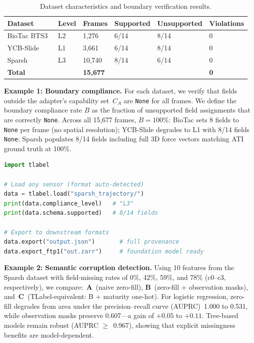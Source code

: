 \documentclass[preprint,12pt,a4paper]{elsarticle}
\begin{document}
\begin{table}[ht]
\centering
\caption{Dataset characteristics and boundary verification results.}
\label{tab:datasets}
\footnotesize
\begin{tabular}{@{}llllll@{}}
\toprule
\textbf{Dataset} & \textbf{Level} & \textbf{Frames} & \textbf{Supported} & \textbf{Unsupported} & \textbf{Violations} \\
\midrule
BioTac BTS3~\cite{zapata2018biotac} & L2 & 1,276 & 6/14 & 8/14 & 0 \\
YCB-Slide~\cite{suresh2022midastouch} & L1 & 3,661 & 6/14 & 8/14 & 0 \\
Sparsh~\cite{kerr2024sparsh} & L3 & 10,740 & 8/14 & 6/14 & 0 \\
\midrule
\textbf{Total} & & \textbf{15,677} & & & \textbf{0} \\
\bottomrule
\end{tabular}
\end{table}

\textbf{Example 1: Boundary compliance.}
For each dataset, we verify that fields outside the adapter's capability set~$C_A$ are \texttt{None} for all frames. We define the boundary compliance rate $B$ as the fraction of unsupported field assignments that are correctly \texttt{None}. Across all 15,677 frames, $B = 100\%$: BioTac sets 8 fields to \texttt{None} per frame (no spatial resolution); YCB-Slide degrades to L1 with 8/14 fields \texttt{None}; Sparsh populates 8/14 fields including full 3D force vectors matching ATI ground truth at 100\%.

\begin{lstlisting}[language=Python]
import tlabel

# Load any sensor (format auto-detected)
data = tlabel.load("sparsh_trajectory/")
print(data.compliance_level)   # "L3"
print(data.schema.supported)   # 8/14 fields

# Export to downstream formats
data.export("output.json")       # full provenance
data.export_ftp1("out.zarr")     # foundation model ready
\end{lstlisting}

\textbf{Example 2: Semantic corruption detection.}
Using 10 features from the Sparsh dataset with field-missing rates of 0\%, 42\%, 59\%, and 78\% (c0--c3, respectively), we compare:~\textbf{A}~(naive zero-fill), \textbf{B}~(zero-fill + observation masks), and~\textbf{C}~(TLabel-equivalent: B + maturity one-hot). For logistic regression, zero-fill degrades from area under the precision--recall curve (AUPRC)~1.000 to 0.531, while observation masks preserve 0.607---a gain of $+0.05$ to $+0.11$. Tree-based models remain robust (AUPRC $\geq$~0.967), showing that explicit missingness benefits are model-dependent.
\end{document}
